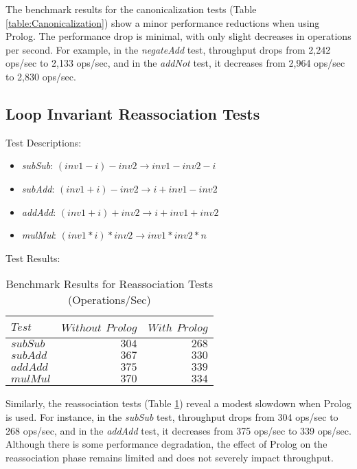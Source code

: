 \vspace{-10pt}

The benchmark results for the canonicalization tests (Table \ref{table:Canonicalization}) show a minor performance reductions when using Prolog. The performance drop is minimal, with only slight decreases in operations per second. For example, in the \textit{negateAdd} test, throughput drops from 2,242 ops/sec to 2,133 ops/sec, and in the \textit{addNot} test, it decreases from 2,964 ops/sec to 2,830 ops/sec.
\newpage
\subsection*{Loop Invariant Reassociation Tests}
Test Descriptions:
\begin{itemize}
    \item \textit{subSub}: $(inv1 - i) - inv2 \rightarrow inv1 - inv2 - i$
    \item \textit{subAdd}: $(inv1 + i) - inv2 \rightarrow i + inv1 - inv2$
    \item \textit{addAdd}: $(inv1 + i) + inv2 \rightarrow i + inv1 + inv2$
    \item \textit{mulMul}: $(inv1 * i) * inv2 \rightarrow inv1 * inv2 * n$
\end{itemize}

Test Results:
\begin{table}[h]
    \centering
    \begin{tabular}{|l|r|r|}
        \hline
        $Test$ & $Without$ $Prolog$ & $With$ $Prolog$ \\
        \hline
        $subSub$ & $304$ & $268$ \\
        $subAdd$ & $367$ & $330$ \\
        $addAdd$ & $375$ & $339$ \\
        $mulMul$ & $370$ & $334$ \\
        \hline
    \end{tabular}
    \caption{Benchmark Results for Reassociation Tests (Operations/Sec)}
    \label{table:Reassociation}
\end{table}

\vspace{-10pt}

Similarly, the reassociation tests (Table \ref{table:Reassociation}) reveal a modest slowdown when Prolog is used. For instance, in the \textit{subSub} test, throughput drops from 304 ops/sec to 268 ops/sec, and in the \textit{addAdd} test, it decreases from 375 ops/sec to 339 ops/sec. Although there is some performance degradation, the effect of Prolog on the reassociation phase remains limited and does not severely impact throughput.

